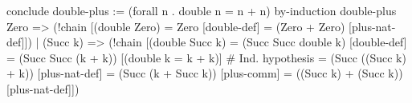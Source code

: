%
%
\begin{tcAthena}
conclude double-plus := (forall n . double n = n + n)
  by-induction double-plus {
    Zero => (!chain [(double Zero)
                   = Zero                       [double-def]
                   = (Zero + Zero)              [plus-nat-def]])
  | (Succ k) => (!chain [(double Succ k)
                       = (Succ Succ double k)   [double-def]
                       = (Succ Succ (k + k))    [(double k = k + k)] # Ind. hypothesis
                       = (Succ ((Succ k) + k))  [plus-nat-def]
                       = (Succ (k + Succ k))    [plus-comm]
                       = ((Succ k) + (Succ k))  [plus-nat-def]])
  }
\end{tcAthena}
